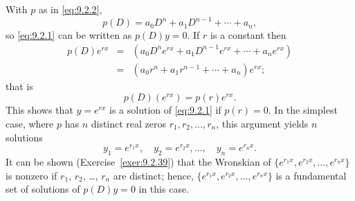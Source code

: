 \documentclass{ximera}
\begin{document}
With $p$ as in \eqref{eq:9.2.2},
$$
p(D)=a_0D^n+a_1D^{n-1}+\cdots+a_n,
$$
so \eqref{eq:9.2.1} can be written as $p(D)y=0$.  If $r$ is a constant
then
\begin{eqnarray*}
p(D)e^{rx}&=&\left(a_0D^ne^{rx}+a_1D^{n-1}e^{rx}+\cdots+a_ne^{rx}\right)\\
&=&(a_0r^n+a_1r^{n-1}+\cdots+a_n)e^{rx};
\end{eqnarray*}
that is
$$
p(D)(e^{rx})=p(r)e^{rx}.
$$
This shows that $y=e^{rx}$ is a solution of \eqref{eq:9.2.1}
if $p(r)=0$.
In the simplest case, where $p$ has $n$ distinct real zeros
$r_1, r_2,\dots, r_n$, this argument yields $n$ solutions
$$
y_1=e^{r_1x},\quad y_2=e^{r_2x},\dots,\quad y_n=e^{r_nx}.
$$
It can be shown (Exercise~\ref{exer:9.2.39}) that the Wronskian of
$\{e^{r_1x},e^{r_2x},\dots,e^{r_nx}\}$ is nonzero if
$r_1$, $r_2$, \dots, $r_n$ are distinct; hence,
$\{e^{r_1x},e^{r_2x},\dots,e^{r_nx}\}$
is a fundamental set of solutions of $p(D)y=0$ in this case.
\end{document}
